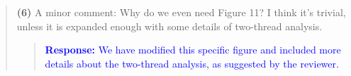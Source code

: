 \documentclass[11pt]{article}
\begin{document}
\begin{quote}
{\bf(6)} A minor comment: Why do we even need Figure 11? I think it's trivial, unless it
is expanded enough with some details of two-thread analysis.

\begin{quote}
\textcolor{blue}{\textbf{Response:} We have modified this specific figure and included more details about the two-thread analysis, as suggested by the reviewer.}
\end{quote}

\end{quote}

\label{LastPage}

\end{document}
